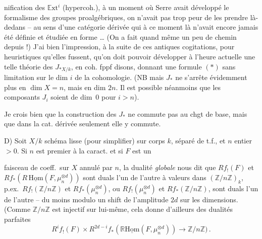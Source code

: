 \documentclass[11pt,a4paper]{article}
\begin{document}
nification des $\mathbb{E}\mathrm{xt}^i$ (hypercoh.), à un moment où Serre avait développé le formalisme des groupes proalgébriques, on n'avait pas trop peur de les prendre là-dedans -- au sens d'une catégorie dérivée qui à ce moment là n'avait encore jamais été définie et étudiée en forme … (On a fait quand même un peu de chemin depuis !) J'ai bien l'impression, à la suite de ces antiques cogitations, pour heuristiques qu'elles fussent, qu'on doit pouvoir développer à l'heure actuelle une telle théorie des $J_{*X/k}$, en coh. fppf disons, donnant une formule $(*)$ sans limitation sur le dim $i$ de la cohomologie. (NB mais $J_*$ ne s'arrête évidemment plus en $\dim X = n$, mais en dim $2n$. Il est possible néanmoins que les composants $J_i$ soient de dim~0 pour $i > n$).

Je crois bien que la construction des $J_*$ ne commute pas au chgt de base, mais que dans la cat. dérivée seulement elle y commute.

D) Soit  $X/k$ schéma lisse (pour simplifier) sur corps $k$, séparé de t.f., et $n$ entier $>0$. Si $n$ est premier à la caract. et si $F$ est un

faisceau de coeff.\ sur $X$ annulé par $n$, la dualité \emph{globale} nous dit que $Rf_!(F)$ et $Rf_*(R\,\underline{\mathrm{Hom}}(F, \mu_n^{\otimes d}))$ sont duals l'un de l'autre à valeurs dans $(\mathbb{Z}/n\mathbb{Z})_k$, p.ex.\ $Rf_!(\mathbb{Z}/n\mathbb{Z})$ et $Rf_*(\mu_n^{\otimes d})$, ou $Rf_!(\mu_n^{\otimes d})$ et $Rf_*(\mathbb{Z}/n\mathbb{Z})$, sont duals l'un de l'autre -- du moins modulo un shift de l'amplitude $2d$ sur les dimensions. (Comme $\mathbb{Z}/n\mathbb{Z}$ est injectif sur lui-même, cela donne d'ailleurs des dualités parfaites
\[
R^if_!(F) \times R^{2d-i}f_*(\mathbb{R}\underline{\mathrm{Hom}}(F, \mu_n^{\otimes d})) \longrightarrow \mathbb{Z}/n\mathbb{Z}) \,.
\]
\end{document}
